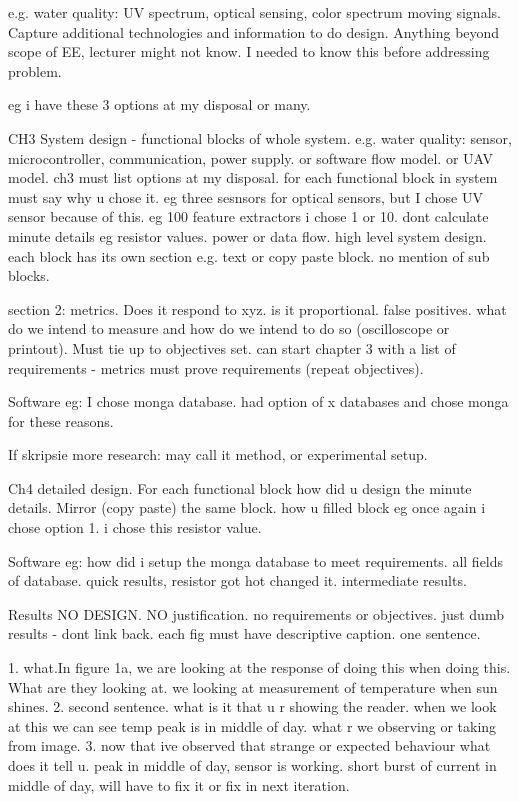 e.g. water quality: UV spectrum, optical sensing, color spectrum moving signals. Capture additional technologies and information to do design. Anything beyond scope of EE, lecturer might not know. I needed to know this before addressing problem. 


eg i have these 3 options at my disposal or many. 

CH3
System design - functional blocks of whole system. e.g. water quality: sensor, microcontroller, communication, power supply. or software flow model. or UAV model. ch3 must list options at my disposal.  for each functional block in system must say why u chose it. eg three sesnsors for optical sensors, but I chose UV sensor because of this. eg 100 feature extractors i chose 1 or 10. dont calculate minute details eg resistor values. power or data flow. 
high level system design. each block has its own section e.g. text or copy paste block. no mention of sub blocks. 

section 2: metrics. Does it respond to xyz. is it proportional. false positives. what do we intend to measure and how do we intend to do so (oscilloscope or printout). Must tie up to objectives set. can start chapter 3 with a list of requirements - metrics must prove requirements (repeat objectives).

Software eg: I chose monga database. had option of x databases and chose monga for these reasons. 

If skripsie more research:
may call it method, or experimental setup. 

Ch4
detailed design. For each functional block how did u design the minute details. Mirror (copy paste) the same block. how u filled block eg once again i chose option 1. i chose this resistor value. 

Software eg: how did i setup the monga database to meet requirements. all fields of database. 
quick results, resistor got hot changed it. intermediate results. 


Results
NO DESIGN. NO justification. no requirements or objectives. just dumb results - dont link back. each fig must have descriptive caption. one sentence. 

1. what.In figure 1a,  we are looking at the response of doing this when doing this. What are they looking at. we looking at measurement of temperature when sun shines. 
2. second sentence. what is it that u r showing the reader. when we look at this we can see temp peak is in middle of day. what r we observing or taking from image. 
3. now that ive observed that strange or expected behaviour what does it tell u. peak in middle of day, sensor is working. short burst of current in middle of day, will have to fix it or fix in next iteration. 

